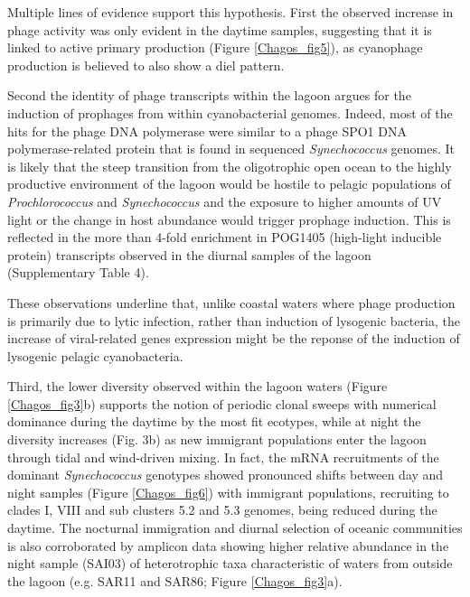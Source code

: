 Multiple lines of evidence support this hypothesis. First the observed increase in phage activity was only evident in the daytime samples, suggesting that it is linked to active primary production (Figure \ref{Chagos_fig5}), as cyanophage production is believed to also show a diel pattern. \cite{kao_diel_2005}

Second the identity of phage transcripts within the lagoon argues for the induction of prophages from within cyanobacterial genomes. Indeed, most of the hits for the phage DNA polymerase were similar to a phage SPO1 DNA polymerase-related protein that is found in sequenced {\em Synechococcus} genomes. It is likely that the steep transition from the oligotrophic open ocean to the highly productive environment of the lagoon would be hostile to pelagic populations of {\em Prochlorococcus} and {\em Synechococcus} and the exposure to higher amounts of UV light or the change in host abundance \cite{paul_prophages_2008} would trigger prophage induction. This is reflected in the more than 4-fold enrichment in POG1405 (high-light inducible protein) transcripts observed in the diurnal samples of the lagoon (Supplementary Table 4).

These observations underline that, unlike coastal waters \cite{wilcox_bacterial-viruses_1994, weinbauer_lysogeny_1999} where phage production is primarily due to lytic infection, rather than induction of lysogenic bacteria, the increase of viral-related genes expression might be the reponse of the induction of lysogenic pelagic cyanobacteria.

Third, the lower diversity observed within the lagoon waters (Figure \ref{Chagos_fig3}b) supports the notion of periodic clonal sweeps \cite{rodriguez-brito_application_2006} with numerical dominance during the daytime by the most fit ecotypes, while at night the diversity increases (Fig. 3b) as new immigrant populations enter the lagoon through tidal and wind-driven mixing. In fact, the mRNA recruitments of the dominant {\em Synechococcus} genotypes showed pronounced shifts between day and night samples (Figure \ref{Chagos_fig6}) with immigrant populations, recruiting to clades I, VIII and sub clusters 5.2 and 5.3 genomes, being reduced during the daytime. The nocturnal immigration and diurnal selection of oceanic communities is also corroborated by amplicon data showing higher relative abundance in the night sample (SAI03) of heterotrophic taxa characteristic of waters from outside the lagoon (e.g. SAR11 and SAR86; Figure \ref{Chagos_fig3}a).

